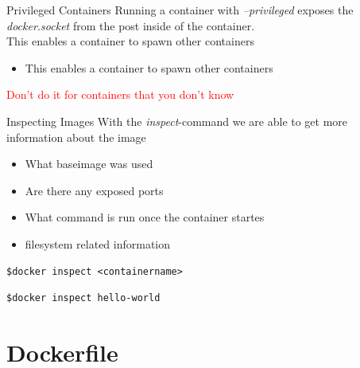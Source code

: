\documentclass[12pt]{beamer}
\begin{document}
\begin{frame}[fragile]{Privileged Containers}
    Running a container with \emph{--privileged} exposes the \emph{docker.socket} from the post inside of the container.\\
    This enables a container to spawn other containers
    \begin{itemize}[label=\textcolor{red}{\textbullet}]
        \item This enables a container to spawn other containers
    \end{itemize}
    \textcolor{red}{Don't do it for containers that you don't know}
\end{frame}

\begin{frame}[fragile]{Inspecting Images}
    With the \emph{inspect}-command we are able to get more information about the image
    \begin{itemize}[label=\textcolor{black}{\textbullet}]
        \item What baseimage was used
        \item Are there any exposed ports
        \item What command is run once the container startes
        \item filesystem related information
    \end{itemize}
    \begin{lstlisting}[language=OwnBash]
$docker inspect <containername>
    \end{lstlisting}
    \begin{lstlisting}[language=OwnBash]
$docker inspect hello-world
    \end{lstlisting}
\end{frame}





\section{Dockerfile}
\end{document}
